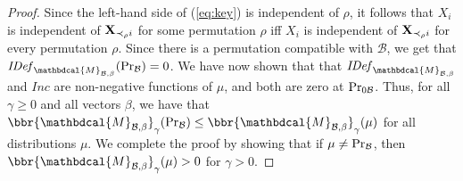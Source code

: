 \documentclass{article}
\theoremstyle{plain}
\theoremstyle{definition}
\theoremstyle{remark}
\newcommand{\dg}[1]{\mathbdcal{#1}}
\newcommand{\IDef}[1]{\mathit{IDef}_{#1}}
\newcommand\Inc{\mathit{Inc}}
\newcommand{\PDGof}[1]{{\dg M}_{#1}}
\numberwithin{equation}{section}
\begin{document}
\begin{proof}
Since the left-hand side of (\ref{eq:key}) is independent of $\rho$,
it follows that $X_i$ is independent of 
${\bf X}_{\prec_\rho i}$ for some permutation $\rho$ iff $X_i$ is independent of
  ${\bf X}_{\prec_\rho i}$ for every permutation $\rho$.  Since there
is a permutation compatible with $\mathcal B$, we get that 
$\IDef{\PDGof{\mathcal B,\beta}}(\Pr_{\cal B}) = 0$.
We have now shown that that $\IDef{\PDGof{\mathcal B, \beta}}$ and $\Inc$ are 
non-negative functions of $\mu$, and both are zero at $\Pr_{0\cal B}$. 
Thus, for all $\gamma \geq 0$ and all vectors $\beta$, we
have that   $\bbr{\PDGof{\mathcal B, \beta}}_\gamma( \Pr_{\cal
  B}) \le \bbr{\PDGof{\mathcal B, \beta}}_\gamma( \mu)$ for all
distributions $\mu$.  We complete the proof by showing that if
$\mu \ne \Pr_{\cal B}$, then 
$\bbr{\PDGof{\mathcal B, \beta}}_\gamma(\mu) > 0$
for $\gamma > 0$.


\end{proof}
\end{document}
